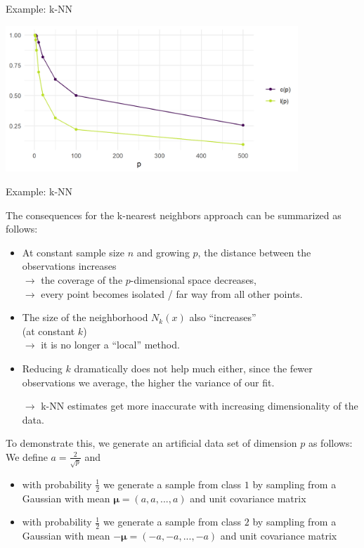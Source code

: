 \documentclass[11pt,compress,t,notes=noshow, xcolor=table]{beamer}
\begin{document}
\begin{vbframe}{Example: k-NN}
\begin{center}
\includegraphics[width = 11cm ]{figure/knn_contrast_locality_plot.png}
\end{center}

\end{vbframe}
\begin{vbframe}{Example: k-NN}


The consequences for the k-nearest neighbors approach can be summarized as follows:

\begin{itemize}
 \item At constant sample size $n$ and growing $p$, the distance between the observations increases\\
 $\rightarrow$ the coverage of the $p$-dimensional space decreases,\\
 $\rightarrow$ every point becomes isolated / far way from all other points.
 \item The size of the neighborhood $N_k(x)$ also \enquote{increases}\\
       (at constant $k$) \\
       $\rightarrow$ it is no longer a \enquote{local} method.
 \item Reducing $k$ dramatically does not help much either,
since the fewer observations we average, the higher the variance of our fit.
 \item[$\rightarrow$] k-NN estimates get more inaccurate with increasing dimensionality of the data.
\end{itemize}

\framebreak

To demonstrate this, we generate an artificial data set of dimension $p$ as follows: We define $a = \frac{2}{\sqrt{p}}$ and 

\begin{itemize}
\item with probability $\frac{1}{2}$ we generate a sample from class $1$ by sampling from a Gaussian with mean $\pmb\mu = (a, a, ..., a)$ and unit covariance matrix
\item with probability $\frac{1}{2}$ we generate a sample from class $2$ by sampling from a  Gaussian with mean $- \pmb\mu = (-a, -a, ..., -a)$ and unit covariance matrix
\end{itemize}



\end{vbframe}
\end{document}
